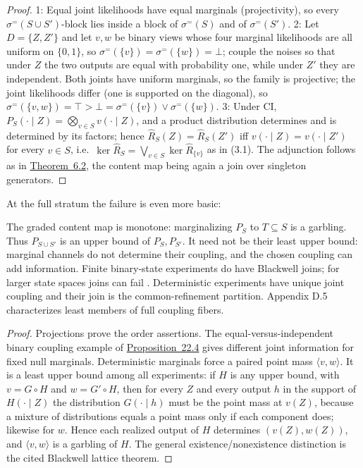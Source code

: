 \begin{proof}

1: Equal joint likelihoods have equal marginals (projectivity), so every \(\sigma^{=}(S \cup S')\)-block lies inside a block of \(\sigma^{=}(S)\) and of \(\sigma^{=}(S')\). 2: Let \(D = \{Z, Z'\}\) and let \(v, w\) be binary views whose four marginal likelihoods are all uniform on \(\{0,1\}\), so \(\sigma^{=}(\{v\}) = \sigma^{=}(\{w\}) = \bot\); couple the noises so that under \(Z\) the two outputs are equal with probability one, while under \(Z'\) they are independent. Both joints have uniform marginals, so the family is projective; the joint likelihoods differ (one is supported on the diagonal), so \(\sigma^{=}(\{v,w\}) = \top > \bot = \sigma^{=}(\{v\}) \vee \sigma^{=}(\{w\})\). 3: Under CI, \(P_S(\cdot \mid Z) = \bigotimes_{v \in S} v(\cdot \mid Z)\), and a product distribution determines and is determined by its factors; hence \(\widehat{R}_S(Z) = \widehat{R}_S(Z')\) iff \(v(\cdot \mid Z) = v(\cdot \mid Z')\) for every \(v \in S\), i.e.~\(\ker \widehat{R}_S = \bigvee_{v \in S} \ker \widehat{R}_{\{v\}}\) as in (3.1). The adjunction follows as in \hyperlink{stmt:6.2}{Theorem~6.2}, the content map being again a join over singleton generators.
\end{proof}

At the full stratum the failure is even more basic:

\begin{thmplain}

The graded content map is monotone: marginalizing \(P_S\) to \(T\subseteq S\) is a garbling. Thus \(P_{S\cup S'}\) is an upper bound of \(P_S,P_{S'}\). It need not be their least upper bound: marginal channels do not determine their coupling, and the chosen coupling can add information. Finite binary-state experiments do have Blackwell joins; for larger state spaces joins can fail \autocite{bertschinger2014}. Deterministic experiments have unique joint coupling and their join is the common-refinement partition. Appendix D.5 characterizes least members of full coupling fibers.
\end{thmplain}

\begin{proof}

Projections prove the order assertions. The equal-versus-independent binary coupling example of \hyperlink{stmt:22.4}{Proposition~22.4} gives different joint information for fixed null marginals. Deterministic marginals force a paired point mass \(\langle v,w\rangle\). It is a least upper bound among all experiments: if \(H\) is any upper bound, with \(v=G\circ H\) and \(w=G'\circ H\), then for every \(Z\) and every output \(h\) in the support of \(H(\cdot\mid Z)\) the distribution \(G(\cdot\mid h)\) must be the point mass at \(v(Z)\), because a mixture of distributions equals a point mass only if each component does; likewise for \(w\). Hence each realized output of \(H\) determines \((v(Z),w(Z))\), and \(\langle v,w\rangle\) is a garbling of \(H\). The general existence/nonexistence distinction is the cited Blackwell lattice theorem.
\end{proof}


